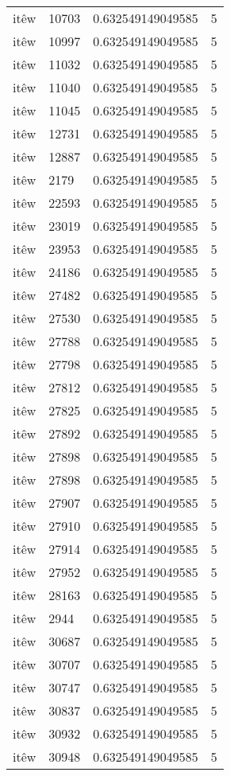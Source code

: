 \begin{longtable}{llll}
itêw & 10703 & 0.632549149049585 & 5\\
itêw & 10997 & 0.632549149049585 & 5\\
itêw & 11032 & 0.632549149049585 & 5\\
itêw & 11040 & 0.632549149049585 & 5\\
itêw & 11045 & 0.632549149049585 & 5\\
itêw & 12731 & 0.632549149049585 & 5\\
itêw & 12887 & 0.632549149049585 & 5\\
itêw & 2179 & 0.632549149049585 & 5\\
itêw & 22593 & 0.632549149049585 & 5\\
itêw & 23019 & 0.632549149049585 & 5\\
itêw & 23953 & 0.632549149049585 & 5\\
itêw & 24186 & 0.632549149049585 & 5\\
itêw & 27482 & 0.632549149049585 & 5\\
itêw & 27530 & 0.632549149049585 & 5\\
itêw & 27788 & 0.632549149049585 & 5\\
itêw & 27798 & 0.632549149049585 & 5\\
itêw & 27812 & 0.632549149049585 & 5\\
itêw & 27825 & 0.632549149049585 & 5\\
itêw & 27892 & 0.632549149049585 & 5\\
itêw & 27898 & 0.632549149049585 & 5\\
itêw & 27898 & 0.632549149049585 & 5\\
itêw & 27907 & 0.632549149049585 & 5\\
itêw & 27910 & 0.632549149049585 & 5\\
itêw & 27914 & 0.632549149049585 & 5\\
itêw & 27952 & 0.632549149049585 & 5\\
itêw & 28163 & 0.632549149049585 & 5\\
itêw & 2944 & 0.632549149049585 & 5\\
itêw & 30687 & 0.632549149049585 & 5\\
itêw & 30707 & 0.632549149049585 & 5\\
itêw & 30747 & 0.632549149049585 & 5\\
itêw & 30837 & 0.632549149049585 & 5\\
itêw & 30932 & 0.632549149049585 & 5\\
itêw & 30948 & 0.632549149049585 & 5\\

\end{longtable}
